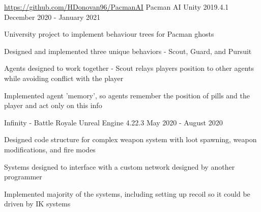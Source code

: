 

\begin{cventries}
    \cventry
    {\href{https://github.com/HDonovan96/PacmanAI}{https://github.com/HDonovan96/PacmanAI}}
    {Pacman AI}
    {Unity 2019.4.1}
    {December 2020 - January 2021}
    {
        \begin{cvitems}
            \item University project to implement behaviour trees for Pacman ghosts
            \item Designed and implemented three unique behaviors - Scout, Guard, and Pursuit
            \item Agents designed to work together - Scout relays players position to other agents while avoiding conflict with the player
            \item Implemented agent 'memory', so agents remember the position of pills and the player and act only on this info
        \end{cvitems}
    }

    \cventry
    {}
    {Infinity - Battle Royale}
    {Unreal Engine 4.22.3}
    {May 2020 - August 2020}
    {
        \begin{cvitems}
            \item Designed code structure for complex weapon system with loot spawning, weapon modifications, and fire modes
            \item Systems designed to interface with a custom network designed by another programmer
            \item Implemented majority of the systems, including setting up recoil so it could be driven by IK systems
        \end{cvitems}
    }



\end{cventries}
